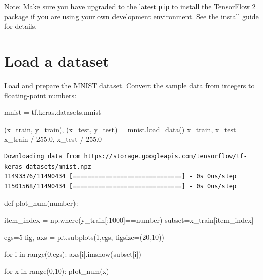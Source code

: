 \documentclass[
  letterpaper,
  DIV=11,
  numbers=noendperiod]{scrreprt}
\newenvironment{Shaded}{\begin{snugshade}}{\end{snugshade}}
\newcommand{\BuiltInTok}[1]{\textcolor[rgb]{0.00,0.23,0.31}{#1}}
\newcommand{\ControlFlowTok}[1]{\textcolor[rgb]{0.00,0.23,0.31}{#1}}
\newcommand{\DecValTok}[1]{\textcolor[rgb]{0.68,0.00,0.00}{#1}}
\newcommand{\FloatTok}[1]{\textcolor[rgb]{0.68,0.00,0.00}{#1}}
\newcommand{\KeywordTok}[1]{\textcolor[rgb]{0.00,0.23,0.31}{#1}}
\newcommand{\NormalTok}[1]{\textcolor[rgb]{0.00,0.23,0.31}{#1}}
\newcommand{\OperatorTok}[1]{\textcolor[rgb]{0.37,0.37,0.37}{#1}}
\begin{document}
Note: Make sure you have upgraded to the latest \texttt{pip} to install
the TensorFlow 2 package if you are using your own development
environment. See the \href{https://www.tensorflow.org/install}{install
guide} for details.

\hypertarget{load-a-dataset}{%
\section{Load a dataset}\label{load-a-dataset}}

Load and prepare the \href{http://yann.lecun.com/exdb/mnist/}{MNIST
dataset}. Convert the sample data from integers to floating-point
numbers:

\begin{Shaded}
\begin{Highlighting}[]
\NormalTok{mnist }\OperatorTok{=}\NormalTok{ tf.keras.datasets.mnist}

\NormalTok{(x\_train, y\_train), (x\_test, y\_test) }\OperatorTok{=}\NormalTok{ mnist.load\_data()}
\NormalTok{x\_train, x\_test }\OperatorTok{=}\NormalTok{ x\_train }\OperatorTok{/} \FloatTok{255.0}\NormalTok{, x\_test }\OperatorTok{/} \FloatTok{255.0}
\end{Highlighting}
\end{Shaded}

\begin{verbatim}
Downloading data from https://storage.googleapis.com/tensorflow/tf-keras-datasets/mnist.npz
11493376/11490434 [==============================] - 0s 0us/step
11501568/11490434 [==============================] - 0s 0us/step
\end{verbatim}

\begin{Shaded}
\begin{Highlighting}[]

\KeywordTok{def}\NormalTok{ plot\_num(number):}

\NormalTok{  item\_index }\OperatorTok{=}\NormalTok{ np.where(y\_train[:}\DecValTok{1000}\NormalTok{]}\OperatorTok{==}\NormalTok{number)}
\NormalTok{  subset}\OperatorTok{=}\NormalTok{x\_train[item\_index]}
  
\NormalTok{  egs}\OperatorTok{=}\DecValTok{5}
\NormalTok{  fig, axs }\OperatorTok{=}\NormalTok{ plt.subplots(}\DecValTok{1}\NormalTok{,egs, figsize}\OperatorTok{=}\NormalTok{(}\DecValTok{20}\NormalTok{,}\DecValTok{10}\NormalTok{))}

  \ControlFlowTok{for}\NormalTok{ i }\KeywordTok{in} \BuiltInTok{range}\NormalTok{(}\DecValTok{0}\NormalTok{,egs):}
\NormalTok{    axs[i].imshow(subset[i])}


\ControlFlowTok{for}\NormalTok{ x }\KeywordTok{in} \BuiltInTok{range}\NormalTok{(}\DecValTok{0}\NormalTok{,}\DecValTok{10}\NormalTok{):}
\NormalTok{  plot\_num(x)}
\end{Highlighting}
\end{Shaded}
\end{document}
